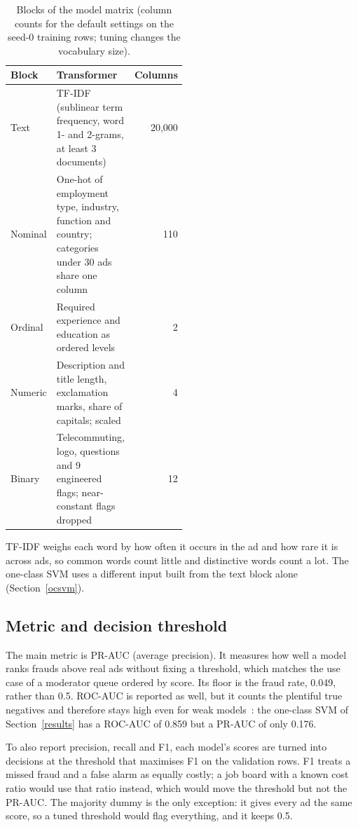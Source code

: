 \begin{table}[tb]
\centering
\small
\begin{tabular}{l>{\raggedright\arraybackslash}p{0.5\linewidth}r}
\toprule
\textbf{Block} & \textbf{Transformer} & \textbf{Columns} \\
\midrule
Text & TF-IDF (sublinear term frequency, word 1- and 2-grams, at least 3 documents) & 20,000 \\
Nominal & One-hot of employment type, industry, function and country; categories under 30 ads share one column & 110 \\
Ordinal & Required experience and education as ordered levels & 2 \\
Numeric & Description and title length, exclamation marks, share of capitals; scaled & 4 \\
Binary & Telecommuting, logo, questions and 9 engineered flags; near-constant flags dropped & 12 \\
\bottomrule
\end{tabular}
\caption{Blocks of the model matrix (column counts for the default settings on the seed-0
training rows; tuning changes the vocabulary size).}
\label{tab:features}
\end{table}

TF-IDF weighs each word by how often it occurs in the ad and how rare it is across ads, so
common words count little and distinctive words count a lot. The one-class SVM uses a different
input built from the text block alone (Section~\ref{ocsvm}).

\subsection{Metric and decision threshold}

The main metric is PR-AUC (average precision). It measures how well a model ranks frauds above
real ads without fixing a threshold, which matches the use case of a moderator queue ordered by
score. Its floor is the fraud rate, 0.049, rather than 0.5. ROC-AUC is reported as well, but it
counts the plentiful true negatives and therefore stays high even for weak
models~\cite{saito2015}: the one-class SVM of Section~\ref{results} has a ROC-AUC of 0.859
but a PR-AUC of only 0.176.

To also report precision, recall and F1, each model's scores are turned into decisions at the
threshold that maximises F1 on the validation rows. F1 treats a missed fraud and a false alarm as
equally costly; a job board with a known cost ratio would use that ratio instead, which would move
the threshold but not the PR-AUC. The majority dummy is the only exception: it gives every ad the
same score, so a tuned threshold would flag everything, and it keeps 0.5.

